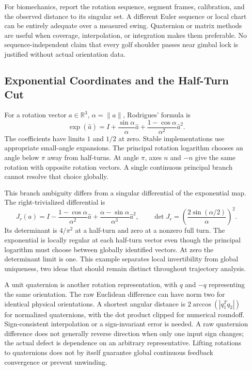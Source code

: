 \documentclass[12pt, openany]{book}
\theoremstyle{plain}
\begin{document}
For biomechanics, report the rotation sequence, segment frames, calibration,
and the observed distance to its singular set. A different Euler sequence or
local chart can be entirely adequate over a measured swing. Quaternion or
matrix methods are useful when coverage, interpolation, or integration makes
them preferable. No sequence-independent claim that every golf shoulder
passes near gimbal lock is justified without actual orientation data.

\subsection{Exponential Coordinates and the Half-Turn Cut}

For a rotation vector $a\in\mathbb R^3$, $\alpha=\|a\|$, Rodrigues' formula is
\begin{equation}\label{eq:manifold_rodrigues}
 \exp(\widehat a)=I+\frac{\sin\alpha}{\alpha}\widehat a
       +\frac{1-\cos\alpha}{\alpha^2}\widehat a^2.
\end{equation}
The coefficients have limits $1$ and $1/2$ at zero. Stable implementations
use appropriate small-angle expansions. The principal rotation logarithm
chooses an angle below $\pi$ away from half-turns. At angle $\pi$, axes $n$
and $-n$ give the same rotation with opposite rotation vectors. A single
continuous principal branch cannot resolve that choice globally.

This branch ambiguity differs from a singular differential of the exponential
map. The right-trivialized differential is
\begin{equation}\label{eq:manifold_exp_jacobian}
 J_r(a)=I-\frac{1-\cos\alpha}{\alpha^2}\widehat a
       +\frac{\alpha-\sin\alpha}{\alpha^3}\widehat a^2,
 \qquad \det J_r=\left(\frac{2\sin(\alpha/2)}{\alpha}\right)^2.
\end{equation}
Its determinant is $4/\pi^2$ at a half-turn and zero at a nonzero full turn.
The exponential is locally regular at each half-turn vector even though the
principal logarithm must choose between globally identified vectors. At
zero the determinant limit is one. This example separates local invertibility
from global uniqueness, two ideas that should remain distinct throughout
trajectory analysis.

A unit quaternion is another rotation representation, with $q$ and $-q$
representing the same orientation. The raw Euclidean difference can have norm
two for identical physical orientations. A shortest angular distance is
$2\arccos(|q_1^Tq_2|)$ for normalized quaternions, with the dot product clipped
for numerical roundoff. Sign-consistent interpolation or a sign-invariant
error is needed. A raw quaternion difference does not generally reverse
direction when only one input sign changes; the actual defect is dependence
on an arbitrary representative. Lifting rotations to quaternions does not
by itself guarantee global continuous feedback convergence or prevent unwinding.
\end{document}
